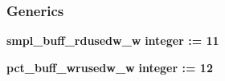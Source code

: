 \subsubsection*{Generics}
 \begin{DoxyCompactItemize}
\item 
{\bf smpl\+\_\+buff\+\_\+rdusedw\+\_\+w} {\bfseries {\bfseries \textcolor{comment}{integer}\textcolor{vhdlchar}{ }\textcolor{vhdlchar}{ }\textcolor{vhdlchar}{\+:}\textcolor{vhdlchar}{=}\textcolor{vhdlchar}{ }\textcolor{vhdlchar}{ } \textcolor{vhdldigit}{11} \textcolor{vhdlchar}{ }}}
\item 
{\bf pct\+\_\+buff\+\_\+wrusedw\+\_\+w} {\bfseries {\bfseries \textcolor{comment}{integer}\textcolor{vhdlchar}{ }\textcolor{vhdlchar}{ }\textcolor{vhdlchar}{\+:}\textcolor{vhdlchar}{=}\textcolor{vhdlchar}{ }\textcolor{vhdlchar}{ } \textcolor{vhdldigit}{12} \textcolor{vhdlchar}{ }}}
\end{DoxyCompactItemize}

